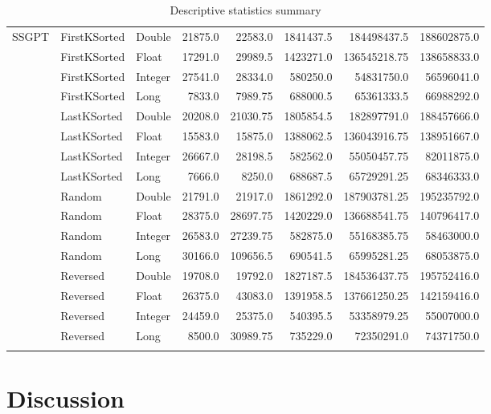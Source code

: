 \documentclass[unicode,11pt,a4paper,oneside,numbers=endperiod,openany]{scrartcl}
\begin{document}
\begin{center}
\begin{longtable}{|l|l|l|r|r|r|r|r|}
            \hline
            \multirow{16}{*}{SSGPT} & FirstKSorted & Double & 21875.0 & 22583.0 & 1841437.5 & 184498437.5 & 188602875.0 \\
            & FirstKSorted & Float & 17291.0 & 29989.5 & 1423271.0 & 136545218.75 & 138658833.0 \\
            & FirstKSorted & Integer & 27541.0 & 28334.0 & 580250.0 & 54831750.0 & 56596041.0 \\
            & FirstKSorted & Long & 7833.0 & 7989.75 & 688000.5 & 65361333.5 & 66988292.0 \\
            & LastKSorted & Double & 20208.0 & 21030.75 & 1805854.5 & 182897791.0 & 188457666.0 \\
            & LastKSorted & Float & 15583.0 & 15875.0 & 1388062.5 & 136043916.75 & 138951667.0 \\
            & LastKSorted & Integer & 26667.0 & 28198.5 & 582562.0 & 55050457.75 & 82011875.0 \\
            & LastKSorted & Long & 7666.0 & 8250.0 & 688687.5 & 65729291.25 & 68346333.0 \\
            & Random & Double & 21791.0 & 21917.0 & 1861292.0 & 187903781.25 & 195235792.0 \\
            & Random & Float & 28375.0 & 28697.75 & 1420229.0 & 136688541.75 & 140796417.0 \\
            & Random & Integer & 26583.0 & 27239.75 & 582875.0 & 55168385.75 & 58463000.0 \\
            & Random & Long & 30166.0 & 109656.5 & 690541.5 & 65995281.25 & 68053875.0 \\
            & Reversed & Double & 19708.0 & 19792.0 & 1827187.5 & 184536437.75 & 195752416.0 \\
            & Reversed & Float & 26375.0 & 43083.0 & 1391958.5 & 137661250.25 & 142159416.0 \\
            & Reversed & Integer & 24459.0 & 25375.0 & 540395.5 & 53358979.25 & 55007000.0 \\
            & Reversed & Long & 8500.0 & 30989.75 & 735229.0 & 72350291.0 & 74371750.0 \\
            \hline
                    \caption{Descriptive statistics summary}
        \label{descr_table}
        \end{longtable}
    \end{center}



\section{Discussion}
\end{document}
